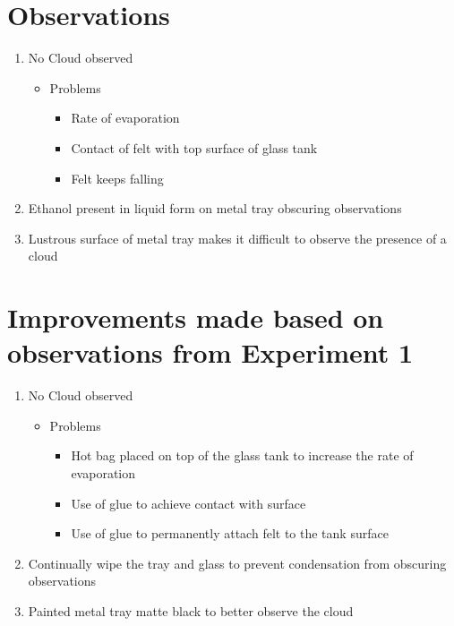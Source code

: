 \documentclass{article}
\begin{document}
\section*{Observations}
\large{\begin{enumerate}
    \item No Cloud observed
    \begin{itemize}
      \item Problems
      \begin{itemize}
          \item Rate of evaporation
          \item Contact of felt with top surface of glass tank
          \item Felt keeps falling
      \end{itemize}
    \end{itemize}
    \item Ethanol present in liquid form on metal tray obscuring observations
    \item Lustrous surface of metal tray makes it difficult to observe the presence of a cloud
\end{enumerate}}

\section*{Improvements made based on observations from Experiment 1}
\large{\begin{enumerate}
  \item No Cloud observed
  \begin{itemize}
      \item Problems
      \begin{itemize}
          \item Hot bag placed on top of the glass tank to increase the rate of evaporation
          \item Use of glue to achieve contact with surface
          \item Use of glue to permanently attach felt to the tank surface
      \end{itemize}
      \end{itemize}
    \item Continually wipe the tray and glass to prevent condensation from obscuring observations
    \item Painted metal tray matte black to better observe the cloud
\end{enumerate}}
\end{document}
